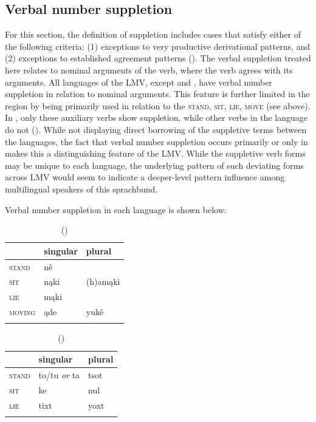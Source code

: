 \documentclass[output=paper]{LSP/langsci}
\begin{document}
\subsection{Verbal number suppletion}

	For this section, the definition of suppletion includes cases that satisfy either of the following criteria: (1) exceptions to very productive derivational patterns, and (2) exceptions to established agreement patterns (\citealt[3]{Veselinova2003}). The verbal suppletion treated here relates to nominal arguments of the verb, where the verb agrees with its arguments. All languages of the LMV, except  and , have verbal number suppletion in relation to nominal arguments. This feature is further limited in the region by being primarily used in relation to the  \textsc{stand}, \textsc{sit}, \textsc{lie}, \textsc{move} (see above). In , only these auxiliary verbs show suppletion, while other verbs in the language do not (\citealt[40]{Haas1946}). While not displaying direct borrowing of the suppletive terms between the languages, the fact that verbal number suppletion occurs primarily or only in  makes this a distinguishing feature of the LMV. While the suppletive verb forms may be unique to each language, the underlying pattern of such deviating forms across LMV  would seem to indicate a deeper-level pattern influence among multilingual speakers of this sprachbund.

	Verbal number suppletion in each language is shown below:

\begin{table}
\caption{ (\citealt[3]{DorseySwanton1912})}
\begin{tabularx}{.5\textwidth}{XXX}
\lsptoprule
& singular & plural \\
\midrule
\textsc{stand} & nê & \\
\textsc{sit} & nąki & (h)amąki \\
 \textsc{lie} & mąki & \\ 
 \textsc{moving} & ąde & yukê \\
 \lspbottomrule
\end{tabularx}
\end{table}
\footnotetext{}

\begin{table}
\caption{ (\citealt[3]{GatschetSwanton1932})}
\begin{tabularx}{.5\textwidth}{XXX }
\lsptoprule
& singular & plural \\
\midrule
\textsc{stand} & to/tu \emph{or} ta & tsot \\
\textsc{sit} & ke & nul \\
\textsc{lie} & tixt & yoxt \\
\lspbottomrule
\end{tabularx} 
\end{table}
\end{document}
